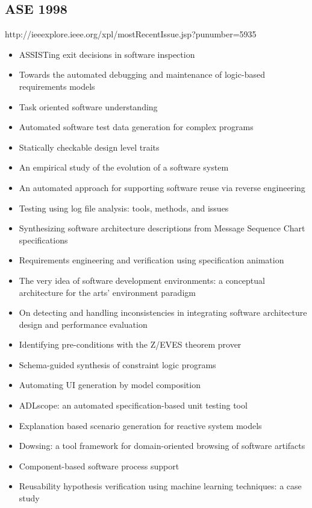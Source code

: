 \subsection{ASE 1998}

http://ieeexplore.ieee.org/xpl/mostRecentIssue.jsp?punumber=5935

{\small
\begin{itemize}[itemsep=-1ex]
  \item ASSISTing exit decisions in software inspection
  \item Towards the automated debugging and maintenance of logic-based requirements models
  \item Task oriented software understanding
  \item Automated software test data generation for complex programs
  \item Statically checkable design level traits
  \item An empirical study of the evolution of a software system
  \item An automated approach for supporting software reuse via reverse engineering
  \item Testing using log file analysis: tools, methods, and issues
  \item Synthesizing software architecture descriptions from Message Sequence Chart specifications
  \item Requirements engineering and verification using specification animation
  \item The very idea of software development environments: a conceptual architecture for the arts' environment paradigm
  \item On detecting and handling inconsistencies in integrating software architecture design and performance evaluation
  \item Identifying pre-conditions with the Z/EVES theorem prover
  \item Schema-guided synthesis of constraint logic programs
  \item Automating UI generation by model composition
  \item ADLscope: an automated specification-based unit testing tool
  \item Explanation based scenario generation for reactive system models
  \item Dowsing: a tool framework for domain-oriented browsing of software artifacts
  \item Component-based software process support
  \item Reusability hypothesis verification using machine learning techniques: a case study

\end{itemize}}
